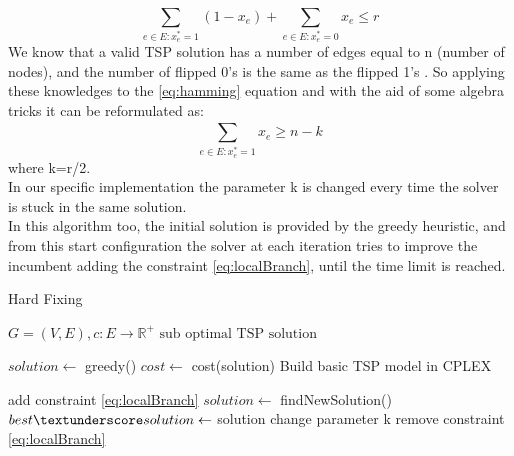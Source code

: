 \begin{equation}\label{eq:hamming}
    \sum_{e\in E: x_e^*=1}^{}(1-x_e) + \sum_{e\in E: x_e^*=0}^{}x_e \leq r
\end{equation}
We know that a valid TSP solution has a number of edges equal to n (number of nodes), and the number of flipped 0’s is the same as the flipped 1’s . So applying these knowledges to the \ref{eq:hamming} equation and with the aid of some algebra tricks it can be reformulated as:
\begin{equation}\label{eq:localBranch}
    \sum_{e\in E: x_e^*=1}^{}x_e \geq n-k
\end{equation}
where k=r/2.
\\
In our specific implementation the parameter k is changed every time the solver is stuck in the same solution. \\
In this algorithm too, the initial solution is provided by the greedy heuristic, and from this start configuration the solver at each iteration tries to improve the incumbent adding the constraint \ref{eq:localBranch}, until the time limit is reached.


\begin{algorithm}
    \caption{Hard Fixing}\label{algo:SoftFixing}
    \begin{algorithmic}[1]
    \Require $G = (V,E), c:E \to \mathbb{R}^+$
    \Ensure $\text{sub optimal TSP solution}$

    \State $solution \gets$ greedy()
    \State $cost \gets $ cost(solution)
    \State Build basic TSP model in CPLEX



    \State add constraint \ref{eq:localBranch}
    \State $solution \gets$ findNewSolution()
    \State $ best\textunderscore solution \gets$ solution
    \State change parameter k
    \EndIf
    \State remove constraint \ref{eq:localBranch}
    \EndWhile

    \end{algorithmic}
\end{algorithm}
